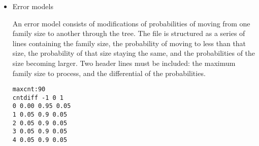 \documentclass{article}
\begin{document}
\begin{itemize}
\item{Error models} \label{errormodel}

An error model consists of modifications of probabilities of moving from one family size to another through the tree. The file is structured as a series of lines containing the family size, the probability of moving to less than that size, the probability of that size staying the same, and the probabilities of the size becoming larger. Two header lines must be included: the maximum family size to process, and the differential of the probabilities.
\begin{lstlisting}
maxcnt:90
cntdiff -1 0 1
0 0.00 0.95 0.05
1 0.05 0.9 0.05
2 0.05 0.9 0.05
3 0.05 0.9 0.05
4 0.05 0.9 0.05
\end{lstlisting}

\end{itemize}
\end{document}
